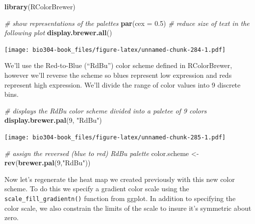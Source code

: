 \documentclass[]{book}
\newenvironment{Shaded}{\begin{snugshade}}{\end{snugshade}}
\newcommand{\CommentTok}[1]{\textcolor[rgb]{0.56,0.35,0.01}{\textit{#1}}}
\newcommand{\DataTypeTok}[1]{\textcolor[rgb]{0.13,0.29,0.53}{#1}}
\newcommand{\DecValTok}[1]{\textcolor[rgb]{0.00,0.00,0.81}{#1}}
\newcommand{\FloatTok}[1]{\textcolor[rgb]{0.00,0.00,0.81}{#1}}
\newcommand{\KeywordTok}[1]{\textcolor[rgb]{0.13,0.29,0.53}{\textbf{#1}}}
\newcommand{\NormalTok}[1]{#1}
\newcommand{\StringTok}[1]{\textcolor[rgb]{0.31,0.60,0.02}{#1}}
\theoremstyle{definition}
\theoremstyle{definition}
\theoremstyle{definition}
\theoremstyle{remark}
\begin{document}
\begin{Shaded}
\begin{Highlighting}[]
\KeywordTok{library}\NormalTok{(RColorBrewer)}

\CommentTok{# show representations of the palettes}
\KeywordTok{par}\NormalTok{(}\DataTypeTok{cex =} \FloatTok{0.5}\NormalTok{) }\CommentTok{# reduce size of text in the following plot}
\KeywordTok{display.brewer.all}\NormalTok{()  }
\end{Highlighting}
\end{Shaded}

\texttt{[image: bio304-book\_files/figure-latex/unnamed-chunk-284-1.pdf]}

We'll use the Red-to-Blue (``RdBu'') color scheme defined in
RColorBrewer, however we'll reverse the scheme so blues represent low
expression and reds represent high expression. We'll divide the range of
color values into 9 discrete bins.

\begin{Shaded}
\begin{Highlighting}[]
\CommentTok{# displays the RdBu color scheme divided into a paletee of 9 colors}
\KeywordTok{display.brewer.pal}\NormalTok{(}\DecValTok{9}\NormalTok{, }\StringTok{"RdBu"}\NormalTok{)  }
\end{Highlighting}
\end{Shaded}

\texttt{[image: bio304-book\_files/figure-latex/unnamed-chunk-285-1.pdf]}

\begin{Shaded}
\begin{Highlighting}[]

\CommentTok{# assign the reversed (blue to red) RdBu palette}
\NormalTok{color.scheme <-}\StringTok{ }\KeywordTok{rev}\NormalTok{(}\KeywordTok{brewer.pal}\NormalTok{(}\DecValTok{9}\NormalTok{,}\StringTok{"RdBu"}\NormalTok{))}
\end{Highlighting}
\end{Shaded}

Now let's regenerate the heat map we created previously with this new
color scheme. To do this we specify a gradient color scale using the
\texttt{scale\_fill\_gradientn()} function from ggplot. In addition to
specifying the color scale, we also constrain the limits of the scale to
insure it's symmetric about zero.
\end{document}
